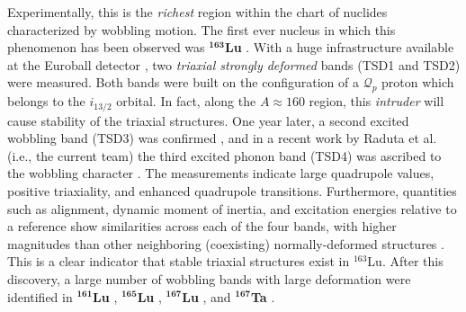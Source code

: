 Experimentally, this is the \emph{richest} region within the chart of nuclides characterized by wobbling motion. The first ever nucleus in which this phenomenon has been observed was $^\mathbf{163}$\textbf{Lu} \cite{odegaard2001evidence}. With a huge infrastructure available at the Euroball detector \cite{simpson1997euroball}, two \emph{triaxial strongly deformed} bands (TSD1 and TSD2) were measured. Both bands were built on the configuration of a $\mathcal{Q}_p$ proton which belongs to the $i_{13/2}$ orbital. In fact, along the $A\approx 160$ region, this \emph{intruder} will cause stability of the triaxial structures. One year later, a second excited wobbling band (TSD3) was confirmed \cite{jensen2002evidence}, and in a recent work by Raduta et al. (i.e., the current team) the third excited phonon band (TSD4) was ascribed to the wobbling character \cite{raduta2017semiclassical,raduta2020towards}. The measurements indicate large quadrupole values, positive triaxiality, and enhanced quadrupole transitions. Furthermore, quantities such as alignment, dynamic moment of inertia, and excitation energies relative to a reference show similarities across each of the four bands, with higher magnitudes than other neighboring (coexisting) normally-deformed structures \cite{jensen2004coexisting}. This is a clear indicator that stable triaxial structures exist in $^{163}$Lu. After this discovery, a large number of wobbling bands with large deformation were identified in $^\mathbf{161}$\textbf{Lu} \cite{bringel2005evidence}, $^\mathbf{165}$\textbf{Lu} \cite{schonwasser2003one}, $^\mathbf{167}$\textbf{Lu} \cite{amro2003wobbling}, and $^\mathbf{167}$\textbf{Ta} \cite{hartley2009wobbling}.

